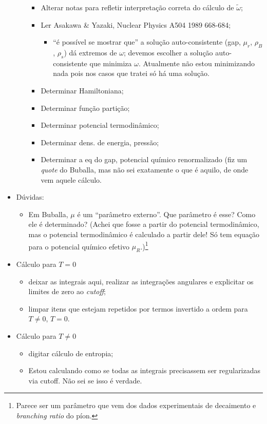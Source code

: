 \begin{itemize}
\begin{itemize}
				\begin{itemize}
					\item[\checkmark] Alterar notas para refletir interpretação correta do cálculo de $\tilde{\omega}$;
					\item[\checkmark] Ler Asakawa \& Yazaki, Nuclear Physics A504 1989 668-684;
						\begin{itemize}
							\item ``é possível se mostrar que'' a solução auto-consistente (gap, $\mu_r$, $\rho_B$, $\rho_s$) dá extremos de $\omega$; devemos escolher a solução auto-consistente que minimiza $\omega$. Atualmente não estou minimizando nada pois nos casos que tratei só há uma solução.
						\end{itemize}
					\item Determinar Hamiltoniana;
					\item Determinar função partição;
					\item Determinar potencial termodinâmico;
					\item Determinar dens. de energia, pressão;
					\item Determinar a eq do gap, potencial químico renormalizado (fiz um \emph{quote} do Buballa, mas não sei exatamente o que é aquilo, de onde vem aquele cálculo.
				\end{itemize}
		\end{itemize}
	\item Dúvidas:
		\begin{itemize}
			\item Em Buballa\cite{Buballa1996}, $\mu$ é um ``parâmetro externo''. Que parâmetro é esse? Como ele é determinado? (Achei que fosse a partir do potencial termodinâmico, mas o potencial termodinâmico é calculado a partir dele! Só tem equação para o potencial químico efetivo $\mu_R$.)\footnote{Parece ser um parâmetro que vem dos dados experimentais de decaimento e \emph{branching ratio} do píon.}
		\end{itemize}
	\item Cálculo para $T = 0$
		\begin{itemize}
			\item deixar as integrais aqui, realizar as integrações angulares e explicitar os limites de zero ao \emph{cutoff};
			\item limpar itens que estejam repetidos por termos invertido a ordem para $T \neq 0$, $T = 0$.
		\end{itemize}
	\item Cálculo para $T \neq 0$
		\begin{itemize}
			\item digitar cálculo de entropia;
			\item Estou calculando como se todas as integrais precisassem ser regularizadas via cutoff. Não sei se isso é verdade.
		\end{itemize}
\end{itemize}
